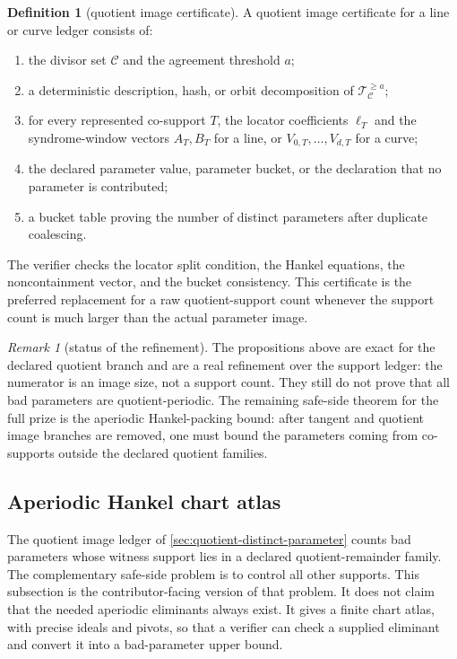 \documentclass[11pt]{article}
\theoremstyle{definition}
\newtheorem{definition}[theorem]{Definition}
\theoremstyle{remark}
\newtheorem{remark}[theorem]{Remark}
\begin{document}
\begin{definition}[quotient image certificate]
\label{def:quotient-image-certificate}
A quotient image certificate for a line or curve ledger consists of:
\begin{enumerate}[label=\textup{(\roman*)}]
\item the divisor set $\mathcal C$ and the agreement threshold $a$;
\item a deterministic description, hash, or orbit decomposition of
$\mathcal T_{\mathcal C}^{\ge a}$;
\item for every represented co-support $T$, the locator coefficients
$\boldsymbol\ell_T$ and the syndrome-window vectors $A_T,B_T$ for a line, or
$V_{0,T},\ldots,V_{d,T}$ for a curve;
\item the declared parameter value, parameter bucket, or the declaration that no
parameter is contributed;
\item a bucket table proving the number of distinct parameters after duplicate
coalescing.
\end{enumerate}
The verifier checks the locator split condition, the Hankel equations, the
noncontainment vector, and the bucket consistency.  This certificate is the
preferred replacement for a raw quotient-support count whenever the support count
is much larger than the actual parameter image.
\end{definition}

\begin{remark}[status of the refinement]
\label{rem:distinct-ledger-status}
The propositions above are exact for the declared quotient branch and are a real
refinement over the support ledger: the numerator is an image size, not a support
count.  They still do not prove that all bad parameters are quotient-periodic.
The remaining safe-side theorem for the full prize is the aperiodic Hankel-packing
bound: after tangent and quotient image branches are removed, one must bound the
parameters coming from co-supports outside the declared quotient families.
\end{remark}


\subsection{Aperiodic Hankel chart atlas}
\label{sec:aperiodic-hankel-certificates}

The quotient image ledger of \cref{sec:quotient-distinct-parameter} counts bad
parameters whose witness support lies in a declared quotient-remainder family.
The complementary safe-side problem is to control all other supports.  This
subsection is the contributor-facing version of that problem.  It does not claim
that the needed aperiodic eliminants always exist.  It gives a finite chart
atlas, with precise ideals and pivots, so that a verifier can check a supplied
eliminant and convert it into a bad-parameter upper bound.
\end{document}
